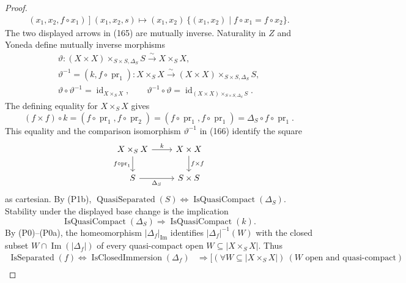 \begin{proof}
\[\begin{aligned}
          (x_1,x_2,f\circ x_1)\ ]{\ (x_1,x_2,s)\mapsto(x_1,x_2)\ }
      \{(x_1,x_2)\mid f\circ x_1=f\circ x_2\}.
  \end{aligned}                                                  \tag{165}
  \]
  The two displayed arrows in (165) are mutually inverse.  Naturality in
  $Z$ and Yoneda define mutually inverse morphisms
  \[
  \begin{gathered}
    \vartheta\colon
      (X\times X)\times_{S\times S,\Delta_S}S
        \xrightarrow{\sim}X\times_SX,\\
    \vartheta^{-1}=(k,f\circ\operatorname{pr}_1)\colon
      X\times_SX
        \xrightarrow{\sim}
      (X\times X)\times_{S\times S,\Delta_S}S,\\
    \vartheta\circ\vartheta^{-1}=\operatorname{id}_{X\times_SX},
    \qquad
    \vartheta^{-1}\circ\vartheta
      =\operatorname{id}_{(X\times X)\times_{S\times S,\Delta_S}S}.
  \end{gathered}                                                   \tag{166}
  \]
  The defining equality for $X\times_SX$ gives
  \[
    (f\times f)\circ k
      =(f\circ\operatorname{pr}_1,f\circ\operatorname{pr}_2)
      =(f\circ\operatorname{pr}_1,f\circ\operatorname{pr}_1)
      =\Delta_S\circ f\circ\operatorname{pr}_1.
  \]
  This equality and the comparison isomorphism
  $\vartheta^{-1}$ in (166) identify the square
  \[
  \begin{tikzcd}
    X\times_SX \arrow[r,"k"]
      \arrow[d,"f\circ\operatorname{pr}_1"'] &
      X\times X \arrow[d,"f\times f"] \\
    S \arrow[r,"\Delta_S"'] & S\times S
  \end{tikzcd}
  \]
  as cartesian.
  By (P1b),
  \(\operatorname{QuasiSeparated}(S)
    \Longleftrightarrow\operatorname{IsQuasiCompact}(\Delta_S)\).
  Stability under the displayed base change is the implication
  \[
    \operatorname{IsQuasiCompact}(\Delta_S)
      \Longrightarrow\operatorname{IsQuasiCompact}(k).             \tag{166a}
  \]
  By (P0)--(P0a), the homeomorphism
  \(|\Delta_f|_{\operatorname{Im}}\) identifies
  \(|\Delta_f|^{-1}(W)\) with the closed subset
  \(W\cap\operatorname{Im}(|\Delta_f|)\) of every quasi-compact open
  \(W\subseteq|X\times_SX|\).  Thus
  \[
  \begin{aligned}
    \operatorname{IsSeparated}(f)
      \Longleftrightarrow\operatorname{IsClosedImmersion}(\Delta_f)
      &\Longrightarrow
      \bigl[(\forall W\subseteq|X\times_SX|)\
        (W\text{ open and quasi-compact})\\

\end{aligned}\]
\end{proof}
